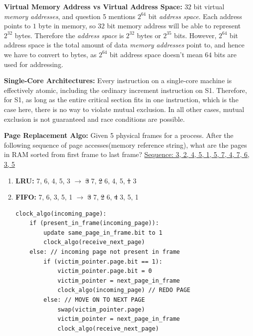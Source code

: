 \documentclass[10pt,landscape]{article}
\begin{document}
\begin{multicols*}{3}
\textbf{Virtual Memory Address vs Virtual Address Space:}
$32$ bit virtual \textit{memory addresses}, and question 5 mentions $2^{64}$ bit \textit{address space}. Each address points to $1$ byte in memory, so $32$ bit memory address will be able to represent $2^{32}$ bytes. Therefore the \textit{address space} is $2^{32}$ bytes or $2^{35}$ bits. 
However, $2^{64}$ bit address space is the total amount of data \textit{memory addresses} point to, and hence we have to convert to bytes, as $2^{64}$ bit address space doesn't mean $64$ bits are used for addressing.

\textbf{Single-Core Architectures:}
Every instruction on a single-core machine is effectively atomic, including the ordinary increment instruction on S1.  Therefore, for S1, as long as the entire critical section fits in one instruction, which is the case here, there is no way to violate mutual exclusion. In all other cases, mutual exclusion is not guaranteed and race conditions are possible.

\textbf{Page Replacement Algo:} Given 5 physical frames for a process. After the following sequence of page accesses(memory reference
string), what are the pages in RAM sorted from first frame to last frame?
\underline{Sequence: 3, 2, 4, 5, 1, 5, 7, 4, 7, 6, 3, 5}
\begin{enumerate}[topsep=0pt,noitemsep,wide=0pt, leftmargin=\dimexpr\labelwidth + 2\labelsep\relax]
    \item \textbf{LRU:} 7, 6, 4, 5, 3 $\rightarrow$ \sout{3} 7, \sout{2} 6, 4, 5, \sout{1} 3 
    \item \textbf{FIFO:} 7, 6, 3, 5, 1 $\rightarrow$ \sout{3} 7, \sout{2} 6, \sout{4} 3, 5, 1
    \begin{lstlisting}
clock_algo(incoming_page):
    if (present_in_frame(incoming_page)): 
        update same_page_in_frame.bit to 1
        clock_algo(receive_next_page)
    else: // incoming page not present in frame
        if (victim_pointer.page.bit == 1): 
            victim_pointer.page.bit = 0
            victim_pointer = next_page_in_frame
            clock_algo(incoming_page) // REDO PAGE
        else: // MOVE ON TO NEXT PAGE
            swap(victim_pointer.page)
            victim_pointer = next_page_in_frame
            clock_algo(receive_next_page) 
    \end{lstlisting}
\end{enumerate}


\end{multicols*}
\end{document}
